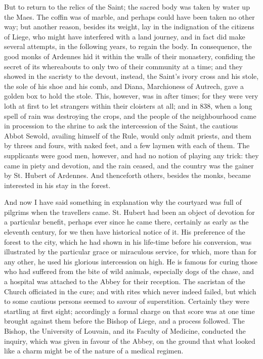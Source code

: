 But to return to the relics of the Saint; the sacred body was taken
by water up the Maes. The coffin was of marble, and perhaps could have
been taken no other way; but another reason, besides its weight, lay
in the indignation of the citizens of Liege, who might have interfered
with a land journey, and in fact did make several attempts, in the
following years, to regain the body. In consequence, the good monks of
Ardennes hid it within the walls of their monastery, confiding the
secret of its whereabouts to only two of their community at a time;
and they showed in the sacristy to the devout, instead, the Saint's
ivory cross and his stole, the sole of his shoe and his comb, and
Diana, Marchioness of Autrech, gave a golden box to hold the stole.
This, however, was in after times; for they were very loth at first to
let strangers within their cloisters at all; and in 838, when a long
spell of rain was destroying the crops, and the people of the
neighbourhood came in procession to the shrine to ask the intercession
of the Saint, the cautious Abbot Sewold, availing himself of the Rule,
would only admit priests, and them by threes and fours, with naked
feet, and a few laymen with each of them. The supplicants were good
men, however, and had no notion of playing any trick: they came in
piety and devotion, and the rain ceased, and the country was the
gainer by St. Hubert of Ardennes. And thenceforth others, besides the
monks, became interested in his stay in the forest.

And now I have said something in explanation why the courtyard was
full of pilgrims when the travellers came. St. Hubert had been an
object of devotion for a particular benefit, perhaps ever since he
came there, certainly as early as the eleventh century, for we then
have historical notice of it. His preference of the forest to the
city, which he had shown in his life-time before his conversion,
was illustrated by the particular grace or miraculous service, for
which, more than for any other, he used his glorious intercession on
high. He is famous for curing those who had suffered from the bite of
wild animals, especially dogs of the chase, and a hospital was
attached to the Abbey for their reception. The sacristan of the Church
officiated in the cure; and with rites which never indeed failed, but
which to some cautious persons seemed to savour of superstition.
Certainly they were startling at first sight; accordingly a formal
charge on that score was at one time brought against them before the
Bishop of Liege, and a process followed. The Bishop, the University of
Louvain, and its Faculty of Medicine, conducted the inquiry, which was
given in favour of the Abbey, on the ground that what looked like a
charm might be of the nature of a medical regimen.

